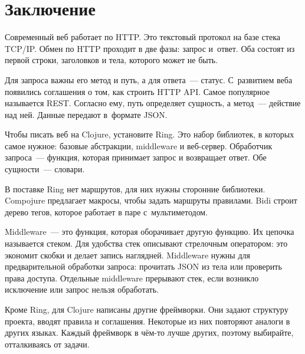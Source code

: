 \section{Заключение}

Современный веб работает по HTTP. Это текстовый протокол на базе стека TCP/IP. Обмен
по HTTP проходит в две фазы: запрос и~ответ. Оба состоят из первой строки,
заголовков и тела, которого может не быть.

Для запроса важны его метод и путь, а для ответа~--- статус. С~развитием веба
появились соглашения о том, как строить HTTP API. Самое популярное называется
REST. Согласно ему, путь определяет сущность, а метод~--- действие над ней. Данные
передают в~формате JSON.

Чтобы писать веб на Clojure, установите Ring. Это набор библиотек, в которых
самое нужное: базовые абстракции, middleware и веб-сервер. Обработчик запроса~---
функция, которая принимает запрос и возвращает ответ. Обе сущности~--- словари.

В поставке Ring нет маршрутов, для них нужны сторонние библиотеки. Compojure
предлагает макросы, чтобы задать маршруты правилами. Bidi строит дерево тегов,
которое работает в паре с~мультиметодом.

Middleware~--- это функция, которая оборачивает другую функцию. Их цепочка
называется стеком. Для удобства стек описывают стрелочным оператором: это
экономит скобки и делает запись наглядней. Middleware нужны для предварительной
обработки запроса: прочитать JSON из тела или проверить права доступа. Отдельные
middleware прерывают стек, если возникло исключение или запрос нельзя
обработать.

Кроме Ring, для Clojure написаны другие фреймворки. Они задают структуру
проекта, вводят правила и соглашения. Некоторые из них повторяют аналоги в
других языках. Каждый фреймворк в чём-то лучше других, поэтому выбирайте,
отталкиваясь от задачи.
